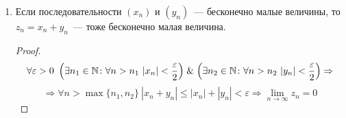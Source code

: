 \begin{enumerate}
	\item Если последовательности $(x_n)$ и $(y_n)$~--- бесконечно малые величины, то $z_n = x_n + y_n$~--- тоже бесконечно малая величина.
	\begin{proof}
	\begin{equation*}
	\forall \varepsilon > 0 \
	\left( \exists n_1 \in \mathbb N \colon \forall n > n_1 \ |x_n| < \frac\varepsilon2 \right) \mathrel{\&}
	\left( \exists n_2 \in \mathbb N \colon \forall n > n_2 \ |y_n| < \frac\varepsilon2 \right) \Rightarrow
	\end{equation*}
	\begin{equation*}
	\Rightarrow \forall n > \max \{ n_1, n_2 \} \ |x_n + y_n| \leqslant |x_n| + |y_n| < \varepsilon \Rightarrow
	\lim_{n \to \infty} z_n = 0
	\end{equation*}
	\end{proof}
\end{enumerate}
